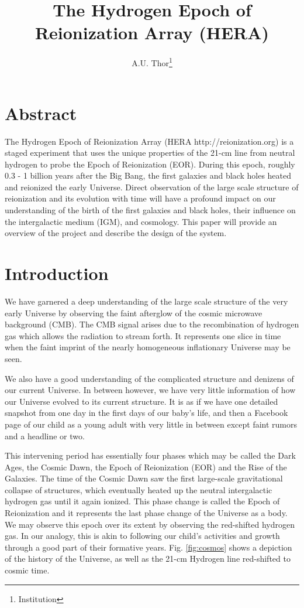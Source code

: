 \documentclass{article}
\title{The Hydrogen Epoch of Reionization Array (HERA)}
\author{A.U. Thor\thanks{Institution}
}
\begin{document}
\maketitle


\section{Abstract}
\label{sec:abstract}
The Hydrogen Epoch of Reionization Array (HERA http://reionization.org) is a staged experiment that uses the unique properties of the 21-cm line from neutral hydrogen to probe the Epoch of Reionization (EOR). During this epoch, roughly 0.3 - 1 billion years after the Big Bang, the first galaxies and black holes heated and reionized the early Universe. Direct observation of the large scale structure of reionization and its evolution with time will have a profound impact on our understanding of the birth of the first galaxies and black holes, their influence on the intergalactic medium (IGM), and cosmology.  This paper will provide an overview of the project and describe the design of the system.

\section{Introduction}
\label{sec:intro}
We have garnered a deep understanding of the large scale structure of the very early Universe by observing the faint afterglow of the cosmic microwave background (CMB).  The CMB signal arises due to the recombination of hydrogen gas which allows the radiation to stream forth.  It represents one slice in time when the faint imprint of the nearly homogeneous inflationary Universe may be seen.

We also have a good understanding of the complicated structure and denizens of our current Universe.  In between however, we have very little information of how our Universe evolved to its current structure.  It is as if we have one detailed snapshot from one day in the first days of our baby's life, and then a Facebook page of our child as a young adult with very little in between except faint rumors and a headline or two.

This intervening period has essentially four phases which may be called the Dark Ages, the Cosmic Dawn, the Epoch of Reionization (EOR) and the Rise of the Galaxies.  The time of the Cosmic Dawn saw the first large-scale gravitational collapse of structures, which eventually heated up the neutral intergalactic hydrogen gas until it again ionized.  This phase change is called the Epoch of Reionization and it represents the last phase change of the Universe as a body.  We may observe this epoch over its extent by observing the red-shifted hydrogen gas.  In our analogy, this is akin to following our child's activities and growth through a good part of their formative years.  Fig. \ref{fig:cosmos} shows a depiction of the history of the Universe, as well as the 21-cm Hydrogen line red-shifted to cosmic time.
\end{document}
